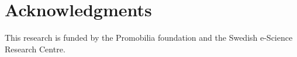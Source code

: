 
%
%
%
%

%	
%

\section*{Acknowledgments}
This research is funded by the Promobilia foundation and the Swedish
e-Science Research Centre.

{\small
}
